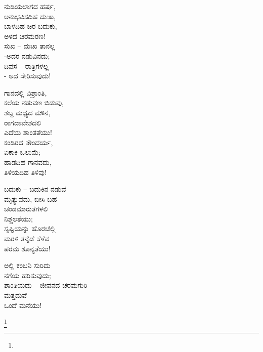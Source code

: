 \begin{myquote}
ನುಡಿಯಲಾಗದ ಹರ್ಷ,\\ಅನುಭವಿಸದಿಹ ದುಃಖ,\\ಬಾಳದಿಹ ಚಿರ ಬದುಕು,\\ಅಳದ ಚಿರಮರಣ!\\ಸುಖ – ದುಃಖ ತಾನಲ್ಲ\\-ಅದರ ನಡುವಿನದು;\\ದಿವಸ – ರಾತ್ರಿಗಳಲ್ಲ\\- ಅದ ಸೇರಿಸುವುದು!
\end{myquote}

\begin{myquote}
ಗಾನದಲ್ಲಿ ವಿಶ್ರಾಂತಿ,\\ಕಲೆಯ ನಡುವಣ ಬಿಡುವು,\\ಶಬ್ದ ಮಧ್ಯದ ಮೌನ,\\ರಾಗದಾವೇಶದಲಿ\\ಎದೆಯ ಶಾಂತತೆಯು!\\ಕಂಡಿರದ ಸೌಂದರ್ಯ,\\ಏಕಾಕಿ ಒಲುಮೆ;\\ಹಾಡದಿಹ ಗಾನವದು,\\ತಿಳಿಯದಿಹ ತಿಳಿವು!
\end{myquote}

\begin{myquote}
ಬದುಕು – ಬದುಕಿನ ನಡುವೆ\\ಮೃತ್ಯುವದು, ಬೀಸಿ ಬಹ\\ಚಂಡಮಾರುತಗಳಲಿ\\ನಿಶ್ಚಲತೆಯು;\\ಸೃಷ್ಟಿಯನ್ನು ಹೊರಚೆಲ್ಲಿ\\ಮರಳಿ ತನ್ನೆಡೆ ಸೆಳೆವ\\ಪರಮ ಶೂನ್ಯತೆಯು!
\end{myquote}

\begin{myquote}
ಅಲ್ಲಿ ಕಂಬನಿ ಸುರಿದು\\ನಗೆಯ ಹರಿಸುವುದು;\\ಶಾಂತಿಯದು – ಜೀವನದ ಚರಮಗುರಿ\\ಮತ್ತದುವೆ\\ಒಂದೆ ಮನೆಯು!
\end{myquote}

\protect\footnote{}

\begin{myquote}
\end{myquote}

